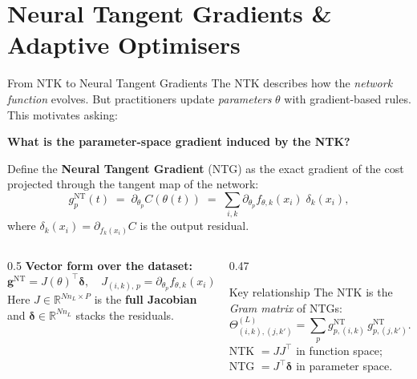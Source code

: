 \documentclass[aspectratio=169, 10pt]{beamer}
\newcommand{\R}{\mathbb{R}}
\begin{document}
\section{Neural Tangent Gradients \& Adaptive Optimisers}

\begin{frame}{From NTK to Neural Tangent Gradients}
  The NTK describes how the \emph{network function} evolves. But practitioners update
  \emph{parameters} $\theta$ with gradient-based rules. This motivates asking:

  \vspace{0.4em}
  \textbf{What is the parameter-space gradient induced by the NTK?}

  \vspace{0.3em}
  Define the \textbf{Neural Tangent Gradient} (NTG) as the exact gradient of the cost
  projected through the tangent map of the network:
  \[
    \boxed{g^{\mathrm{NT}}_p(t) \;=\; \partial_{\theta_p}C(\theta(t))
      \;=\; \sum_{i,k} \partial_{\theta_p}f_{\theta,k}(x_i)\;\delta_k(x_i)},
  \]
  where $\delta_k(x_i) = \partial_{f_k(x_i)}C$ is the output residual.

  \begin{columns}[T]
    \begin{column}{0.5\textwidth}
      \textbf{Vector form over the dataset:}
      \[
        \mathbf{g}^{\mathrm{NT}} = J(\theta)^\top \bm{\delta},
        \quad J_{(i,k),\,p} = \partial_{\theta_p}f_{\theta,k}(x_i).
      \]
      Here $J\in\R^{Nn_L\times P}$ is the \textbf{full Jacobian} and
      $\bm{\delta}\in\R^{Nn_L}$ stacks the residuals.
    \end{column}
    \begin{column}{0.47\textwidth}
      \begin{block}{Key relationship}
        The NTK is the \emph{Gram matrix} of NTGs:
        \[
          \Theta^{(L)}_{(i,k),(j,k')} = \sum_p g^{\mathrm{NT}}_{p,(i,k)}\,g^{\mathrm{NT}}_{p,(j,k')}.
        \]
        NTK $= J J^\top$ in function space;\; NTG $= J^\top\bm\delta$ in parameter space.
      \end{block}
    \end{column}
  \end{columns}
\end{frame}
\end{document}

